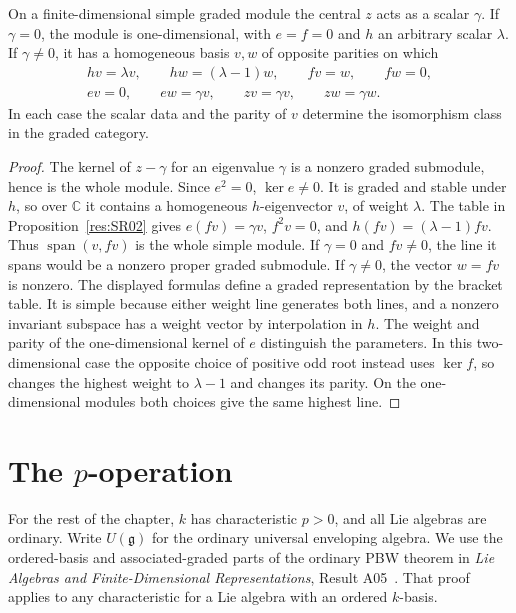 \begin{example}
\label{res:SR04}
On a finite-dimensional simple graded module the central \(z\)
acts as a scalar \(\gamma\). If \(\gamma=0\), the module is
one-dimensional, with \(e=f=0\) and \(h\) an arbitrary scalar
\(\lambda\). If \(\gamma\ne0\), it has a homogeneous basis
\(v,w\) of opposite parities on which
\[
\begin{gathered}
 hv=\lambda v,\qquad hw=(\lambda-1)w,\qquad
 fv=w,\qquad fw=0,\\
 ev=0,\qquad ew=\gamma v,\qquad
 zv=\gamma v,\qquad zw=\gamma w .
\end{gathered}
\]
In each case the scalar data and the parity of \(v\)
determine the isomorphism class in the graded category.
\end{example}

\begin{proof}
The kernel of \(z-\gamma\) for an eigenvalue \(\gamma\)
is a nonzero graded submodule, hence is the whole module.
Since \(e^2=0\), \(\ker e\ne0\). It is graded and
stable under \(h\), so over \(\mathbb C\) it contains a
homogeneous \(h\)-eigenvector \(v\), of weight \(\lambda\).
The table in Proposition~\ref{res:SR02} gives
\(e(fv)=\gamma v\), \(f^2v=0\), and \(h(fv)=(\lambda-1)fv\).
Thus \(\operatorname{span}(v,fv)\) is the whole simple module.
If \(\gamma=0\) and \(fv\ne0\), the line it spans would be a
nonzero proper graded submodule. If \(\gamma\ne0\), the
vector \(w=fv\) is nonzero. The displayed formulas define
a graded representation by the bracket table. It is simple
because either weight line generates both lines, and a nonzero
invariant subspace has a weight vector by interpolation in \(h\).
The weight and parity of the one-dimensional kernel of \(e\)
distinguish the parameters. In this two-dimensional case the
opposite choice of positive odd root instead uses \(\ker f\),
so changes the highest weight to \(\lambda-1\) and changes
its parity. On the one-dimensional modules both choices
give the same highest line.
\end{proof}

\section{The \texorpdfstring{\(p\)}{p}-operation}

For the rest of the chapter, \(k\) has characteristic \(p>0\),
and all Lie algebras are ordinary. Write \(U(\mathfrak g)\)
for the ordinary universal enveloping algebra. We use the
ordered-basis and associated-graded parts of the ordinary PBW
theorem in \emph{Lie Algebras and Finite-Dimensional
Representations}, Result A05~\cite[PDF pp.~8--9]{mg-lie}.
That proof applies to any characteristic for a Lie algebra
with an ordered \(k\)-basis.

